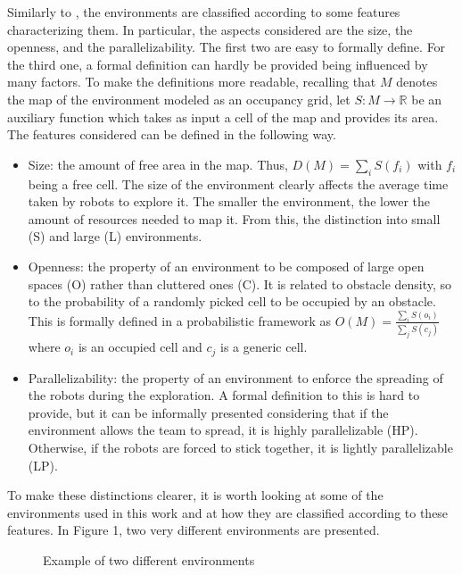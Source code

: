 Similarly to \cite{Cattaneo2017}, the environments are classified according
to some features characterizing them. In particular, the aspects considered
are the size, the openness, and the parallelizability. The first two
are easy to formally define. For the third one, a formal definition
can hardly be provided being influenced by many factors. To make the
definitions more readable, recalling that $M$ denotes the map of
the environment modeled as an occupancy grid, let $S:M\rightarrow\mathbb{R}$
be an auxiliary function which takes as input a cell of the map and
provides its area. The features considered can be defined in the following
way.
\begin{itemize}
\item Size: the amount of free area in the map. Thus, $D(M)=\sum_{i}S(f_{i})$
with $f_{i}$ being a free cell. The size of the environment clearly
affects the average time taken by robots to explore it. The smaller
the environment, the lower the amount of resources needed to map it.
From this, the distinction into small (S) and large (L) environments.
\item Openness: the property of an environment to be composed of large open
spaces (O) rather than cluttered ones (C). It is related to obstacle
density, so to the probability of a randomly picked cell to be occupied
by an obstacle. This is formally defined in a probabilistic framework
as $O\left(M\right)=\frac{\sum_{i}S(o_{i})}{\sum_{j}S(c_{j})}$where
$o_{i}$ is an occupied cell and $c_{j}$ is a generic cell.
\item Parallelizability: the property of an environment to enforce the spreading
of the robots during the exploration. A formal definition to this
is hard to provide, but it can be informally presented considering
that if the environment allows the team to spread, it is highly parallelizable
(HP). Otherwise, if the robots are forced to stick together, it is
lightly parallelizable (LP). 
\end{itemize}
To make these distinctions clearer, it is worth looking at some of
the environments used in this work and at how they are classified
according to these features. In Figure 1, two very different environments
are presented. 
\begin{figure}
\quad{}\quad{}\caption{Example of two different environments}

\end{figure}

